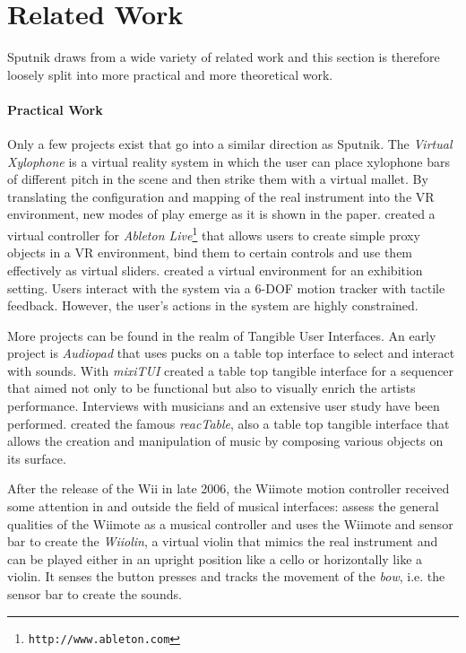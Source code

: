 \documentclass[10pt,a4paper]{scrartcl}
\begin{document}
\section{Related Work}
Sputnik draws from a wide variety of related work and this section is therefore loosely split into more practical and more theoretical work. 

\paragraph{Practical Work}
Only a few projects exist that go into a similar direction as Sputnik. The \emph{Virtual Xylophone}\citep{Maki-Patola2005} is a virtual reality system in which the user can place xylophone bars of different pitch in the scene and then strike them with a virtual mallet. By translating the configuration and mapping of the real instrument into the VR environment, new modes of play emerge as it is shown in the paper. \cite{Zappi2010} created a virtual controller for \emph{Ableton Live}\footnote{\texttt{http://www.ableton.com}} that allows users to create simple proxy objects in a VR environment, bind them to certain controls and use them effectively as virtual sliders. \cite{Rodet2005} created a virtual environment for an exhibition setting. Users interact with the system via a 6-DOF motion tracker with tactile feedback. However, the user's actions in the system are highly constrained.

More projects can be found in the realm of Tangible User Interfaces. An early project is \emph{Audiopad}\citep{Patten2002} that uses pucks on a table top interface to select and interact with sounds. With \emph{mixiTUI} \cite{Pedersen2009} created a table top tangible interface for a sequencer that aimed not only to be functional but also to visually enrich the artists performance. Interviews with musicians and an extensive user study have been performed. \cite{Jorda2007} created the famous \emph{reacTable}, also a table top tangible interface that allows the creation and manipulation of music by composing various objects on its surface.

After the release of the Wii in late 2006, the Wiimote motion controller received some attention in and outside the field of musical interfaces: 
\cite{Kiefer2008} assess the general qualities of the Wiimote as a musical controller and \cite{Miller2010} uses the Wiimote and sensor bar to create the \emph{Wiiolin}, a virtual violin that mimics the real instrument and can be played either in an upright position like a cello or horizontally like a violin. It senses the button presses and tracks the movement of the \emph{bow}, i.e. the sensor bar to create the sounds.
\end{document}
